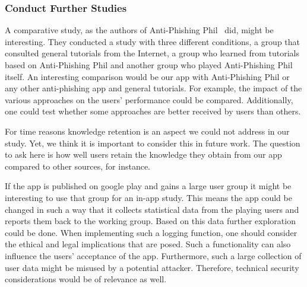 \subsubsection{Conduct Further Studies}
\begin{description}[leftmargin=0cm]
	\item[Comparative Study:] A comparative study, as the authors of Anti-Phishing Phil~\cite{sheng2007antiphishingphil} did, might be interesting.
	They conducted a study with three different conditions, a group that consulted general tutorials from the Internet, a  group who learned from tutorials based on Anti-Phishing Phil and another group who played Anti-Phishing Phil itself.
	An interesting comparison would be our app with Anti-Phishing Phil or any other anti-phishing app and general tutorials.
For example, the impact of the various approaches on the users' performance could be compared.
Additionally, one could test whether some approaches are better received by users than others.
	\item[Study on Retention:] For time reasons knowledge retention is an aspect we could not address in our study.
	Yet, we think it is important to consider this in future work.
	The question to ask here is how well users retain the knowledge they obtain from our app compared to other sources, for instance.
	\item[In-App Statistics:] If the app is published on google play and gains a large user group it might be interesting to use that group for an in-app study. This means the app could be changed in such a way that it collects statistical data from the playing users and reports them back to the working group. Based on this data further exploration could be done. When implementing such a logging function, one should consider the ethical and legal implications that are posed. Such a functionality can also influence the users' acceptance of the app. Furthermore, such a large collection of user data might be misused by a potential attacker. Therefore, technical security considerations would be of relevance as well.
\end{description}

